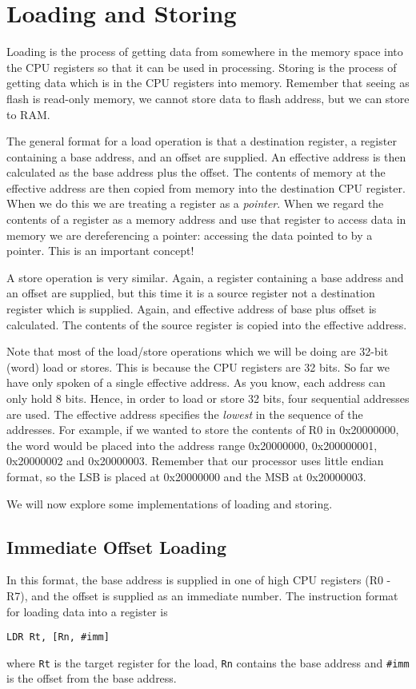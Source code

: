 \chapter{Loading and Storing}
\label{chap:load_store}

Loading is the process of getting data from somewhere in the memory space into the CPU registers so that it can be used in processing. Storing is the process of getting data which is in the CPU registers into memory. Remember that seeing as flash is read-only memory, we cannot store data to flash address, but we can store to RAM.

The general format for a load operation is that a destination register, a register containing a base address, and an offset are supplied. An effective address is then calculated as the base address plus the offset. The contents of memory at the effective address are then copied from memory into the destination CPU register. When we do this we are treating a register as a \emph{pointer}. When we regard the contents of a register as a memory address and use that register to access data in memory we are dereferencing a pointer: accessing the data pointed to by a pointer. This is an important concept!

A store operation is very similar. Again, a register containing a base address and an offset are supplied, but this time it is a source register not a destination register which is supplied. Again, and effective address of base plus offset is calculated. The contents of the source register is copied into the effective address. 

Note that most of the load/store operations which we will be doing are 32-bit (word) load or stores. This is because the CPU registers are 32 bits. So far we have only spoken of a single effective address. As you know, each address can only hold 8 bits. Hence, in order to load or store 32 bits, four sequential addresses are used. The effective address specifies the \emph{lowest} in the sequence of the addresses. For example, if we wanted to store the contents of R0 in 0x20000000, the word would be placed into the address range 0x20000000, 0x200000001, 0x20000002 and 0x20000003. Remember that our processor uses little endian format, so the LSB is placed at 0x20000000 and the MSB at 0x20000003.

We will now explore some implementations of loading and storing.

\section{Immediate Offset Loading}
In this format, the base address is supplied in one of high CPU registers (R0 - R7), and the offset is supplied as an immediate number. 
The instruction format for loading data into a register is
\begin{lstlisting}[fontadjust=true,frame=trBL]
LDR Rt, [Rn, #imm]
\end{lstlisting}
where \texttt{Rt} is the target register for the load, \texttt{Rn} contains the base address and \texttt{\#imm} is the offset from the base address.

